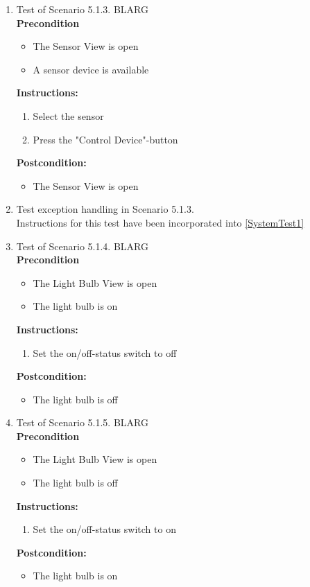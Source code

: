 \documentclass[a4paper]{article}
\newlength{\testlabellength}
\newenvironment{testlist}{\begin{enumerate}[label=\bfseries Instruction \thesubsection.\arabic* , labelindent=0pt, labelwidth=\testlabellength , leftmargin=2cm]}{\end{enumerate}}
\newenvironment{precondition}{
{\color{white}BLARG}\\ 
\textbf{Precondition}
\begin{itemize}[labelindent=0cm, labelwidth=2cm , leftmargin=1cm]
}
{\end{itemize}}
\newenvironment{instruction}{
\textbf{Instructions:}
\begin{enumerate}[label=\bfseries  \arabic*., labelindent=0cm, labelwidth=2cm , leftmargin=1cm]
}
{\end{enumerate}}
\newenvironment{postcondition}{
\textbf{Postcondition:}
\begin{itemize}[labelindent=0cm, labelwidth=2cm , leftmargin=1cm]
}
{\end{itemize}}
\begin{document}
\begin{appendices}
\begin{testlist}
	\item Test of Scenario 5.1.3.
		\begin{precondition}
			\item The Sensor View is open
			\item A sensor device is available
		\end{precondition}
		\begin{instruction}
			\item Select the sensor
			\item Press the "Control Device"-button
		\end{instruction}
		\begin{postcondition}
			\item The Sensor View is open
		\end{postcondition}

	\item  Test exception handling in Scenario 5.1.3. \\
		Instructions for this test have been incorporated into \ref{SystemTest1}

	\item  Test of Scenario 5.1.4.
		\begin{precondition}
			\item The Light Bulb View is open
			\item The light bulb is on
		\end{precondition}
		\begin{instruction}
			\item Set the on/off-status switch to off
		\end{instruction}
		\begin{postcondition}
			\item The light bulb is off
		\end{postcondition}
\newpage
	\item  Test of Scenario 5.1.5.
		\begin{precondition}
			\item The Light Bulb View is open
			\item The light bulb is off
		\end{precondition}
		\begin{instruction}
			\item Set the on/off-status switch to on
		\end{instruction}
		\begin{postcondition}
			\item The light bulb is on
		\end{postcondition}


\end{testlist}
\end{appendices}
\end{document}
